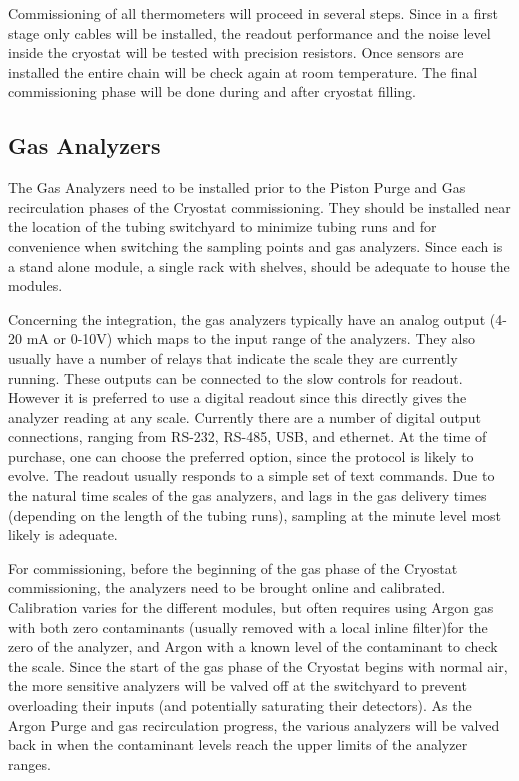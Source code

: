 Commissioning of all thermometers will proceed in several steps. Since in a first stage only cables will be installed,
the readout performance and the noise level inside the cryostat will be
tested with precision resistors. Once sensors are installed the entire chain will be check again at room temperature.
The final commissioning phase will be done during and after cryostat filling.  


\subsection{Gas Analyzers}
\label{sec:fdgen-slow-cryo-install-ga}
 
The Gas Analyzers need to be installed prior to the Piston Purge and Gas recirculation phases of the Cryostat commissioning. They should be installed near the location of the tubing switchyard to minimize tubing runs and for convenience when switching the sampling points and gas analyzers. Since each is a stand alone module, a single rack with shelves, should be adequate to house the modules.

Concerning the integration, the gas analyzers typically have an analog output (4-20 \si{mA} or 0-10\si{V}) which maps to the input range of the analyzers. They also usually have a number of relays that indicate the scale they are currently running. These outputs can be connected to the slow controls for readout. However it is preferred to use a digital readout since this directly gives the analyzer reading at any scale. Currently there are a number of digital output connections, ranging from RS-232, RS-485, USB, and ethernet. At the time of purchase, one can choose the preferred option, since the protocol is likely to evolve. The readout usually responds to a simple set of text commands. Due to the natural time scales of the gas analyzers, and lags in the gas delivery times (depending on the length of the tubing runs), sampling at the minute level most likely is adequate.

For commissioning, before the beginning of the gas phase of the Cryostat commissioning, the analyzers need to be brought online and calibrated. Calibration varies for the different modules, but often requires using Argon gas with both zero contaminants (usually removed with a local inline filter)for the zero of the analyzer, and Argon with a known level of the contaminant to check the scale. Since the start of the gas phase of the Cryostat begins with normal air, the more sensitive analyzers will be valved off at the switchyard to prevent overloading their inputs (and potentially saturating their detectors). As the Argon Purge and gas recirculation progress, the various analyzers will be valved back in when the contaminant levels reach the upper limits of the analyzer ranges. 


